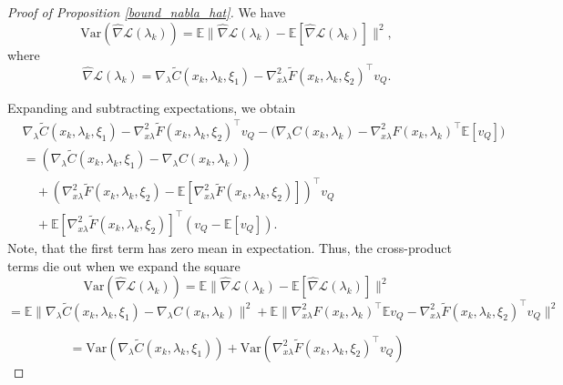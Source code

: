 \documentclass[11pt, twoside]{report}
\begin{document}
\begin{proof}[Proof of Proposition \ref{bound_nabla_hat}]
We have
\[
\mathrm{Var}(\widehat{\nabla}\mathcal{L}(\lambda_k)) 
= \mathbb{E}\big\|\widehat{\nabla}\mathcal{L}(\lambda_k) - \mathbb{E}[\widehat{\nabla}\mathcal{L}(\lambda_k)]\big\|^2,
\]
where
\[
\widehat{\nabla}\mathcal{L}(\lambda_k) 
= \nabla_\lambda \tilde{C}(x_k,\lambda_k,\xi_1) 
- \nabla_{x \lambda}^2 \tilde{F}(x_k,\lambda_k,\xi_2)^\top v_Q.
\]

Expanding and subtracting expectations, we obtain
\[
\begin{aligned}
& \nabla_\lambda \tilde{C}(x_k,\lambda_k,\xi_1) 
- \nabla_{x \lambda}^2 \tilde{F}(x_k,\lambda_k,\xi_2)^\top v_Q
- \big(\nabla_\lambda C(x_k,\lambda_k) - \nabla_{x \lambda}^2 F(x_k,\lambda_k)^\top \mathbb{E}[v_Q]\big) \\
&= (\nabla_\lambda \tilde{C}(x_k,\lambda_k,\xi_1) - \nabla_\lambda C(x_k,\lambda_k)) \\
&\quad + (\nabla_{x \lambda}^2 \tilde{F}(x_k,\lambda_k,\xi_2) - \mathbb{E}[\nabla_{x \lambda}^2 \tilde{F}(x_k,\lambda_k,\xi_2)])^\top v_Q \\
&\quad + \mathbb{E}[\nabla_{x \lambda}^2 \tilde{F}(x_k,\lambda_k,\xi_2)]^\top (v_Q - \mathbb{E}[v_Q]).
\end{aligned}
\]
Note, that the first term has zero mean in expectation. Thus, the cross-product terms die out when we expand the square
\[
\mathrm{Var}(\widehat{\nabla}\mathcal{L}(\lambda_k)) 
= \mathbb{E}\big\|\widehat{\nabla}\mathcal{L}(\lambda_k) - \mathbb{E}[\widehat{\nabla}\mathcal{L}(\lambda_k)]\big\|^2
\]
\[= \mathbb{E}\|\nabla_\lambda \tilde{C}(x_k,\lambda_k,\xi_1) - \nabla_\lambda C (x_k,\lambda_k)\|^2 + \mathbb{E}\|\nabla_{x \lambda}^2 F (x_k,\lambda_k)^\top \mathbb{E} v_Q - \nabla_{x \lambda}^2 \tilde{F}(x_k,\lambda_k,\xi_2)^\top v_Q\|^2\]

\begin{equation} \label{ind_var_nabhatprop}
    =\mathrm{Var}\left(\nabla_\lambda \tilde{C}(x_k,\lambda_k,\xi_1) \right) + \mathrm{Var}\left(\nabla_{x \lambda}^2 \tilde{F}(x_k,\lambda_k,\xi_2)^\top v_Q \right)
\end{equation}


\end{proof}
\end{document}

